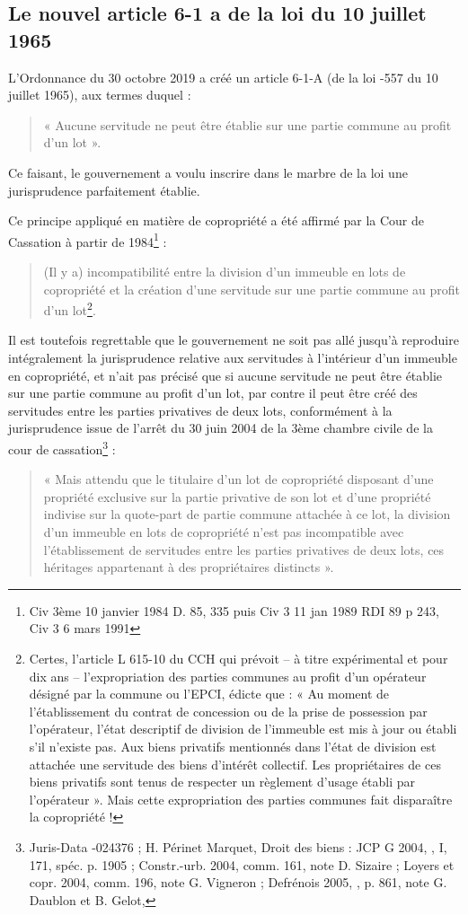 	\subsection{Le nouvel article 6-1 a de la loi du 10 juillet 1965}
	
		L’Ordonnance du 30 octobre 2019 a créé un article 6-1-A (de la loi -557 du 10 juillet 1965), aux termes
		duquel :
		\begin{quote}
			« Aucune servitude ne peut être établie sur une partie commune au profit d’un lot ».
		\end{quote}
		Ce faisant, le gouvernement a voulu inscrire dans le marbre de la loi une jurisprudence parfaitement
		établie.
		
		Ce principe appliqué en matière de copropriété a été affirmé par la Cour de Cassation à partir de 1984\footnote{Civ 3ème 10 janvier 1984 D. 85, 335 puis Civ 3\degre{} 11 jan 1989 RDI 89 p 243, Civ 3\degre{} 6 mars 1991} :
		\begin{quote}
			(Il y a) incompatibilité entre la division d'un immeuble en lots de copropriété et la création d'une servitude
			sur une partie commune au profit d'un lot\footnote{Certes, l’article L 615-10 du CCH qui prévoit – à titre expérimental et pour dix ans – l’expropriation des parties communes au profit d’un opérateur désigné par la commune ou l’EPCI, édicte que : « Au  moment de l'établissement du contrat de concession ou de la prise de possession par l'opérateur, l'état		descriptif de division de l'immeuble est mis à jour ou établi s'il n'existe pas. Aux biens privatifs mentionnés dans l'état de division est attachée une servitude des biens d'intérêt collectif. Les propriétaires de ces biens privatifs sont tenus de respecter un règlement d'usage établi par l'opérateur ». Mais cette expropriation des parties communes fait disparaître la copropriété !}.
		\end{quote}
		
		Il est toutefois regrettable que le gouvernement ne soit pas allé jusqu’à reproduire intégralement la
		jurisprudence relative aux servitudes à l’intérieur d’un immeuble en copropriété, et n’ait pas précisé que
		si aucune servitude ne peut être établie sur une partie commune au profit d’un lot, par contre il peut être
		créé des servitudes entre les parties privatives de deux lots, conformément à la jurisprudence issue de
		l’arrêt du 30 juin 2004 de la 3ème chambre civile de la cour de cassation\footnote{Juris-Data -024376 ; H. Périnet Marquet, Droit des biens : JCP G 2004, , I, 171, spéc. p. 1905 ; Constr.-urb. 2004, comm. 161, note D. Sizaire ; Loyers et copr. 2004, comm. 196, note G. Vigneron ; Defrénois 2005, , p. 861, note G. Daublon et B. Gelot,} :
		\begin{quote}
			« Mais attendu que le titulaire d'un lot de copropriété disposant d'une propriété exclusive sur la partie
			privative de son lot et d'une propriété indivise sur la quote-part de partie commune attachée à ce lot, la
			division d'un immeuble en lots de copropriété n'est pas incompatible avec l'établissement de servitudes
			entre les parties privatives de deux lots, ces héritages appartenant à des propriétaires distincts ».
		\end{quote}
		
